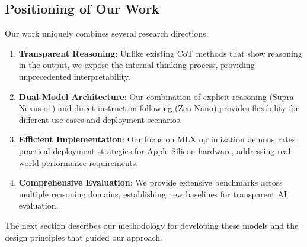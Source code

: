 \subsection{Positioning of Our Work}

Our work uniquely combines several research directions:

\begin{enumerate}
    \item \textbf{Transparent Reasoning}: Unlike existing CoT methods that show reasoning in the output, we expose the internal thinking process, providing unprecedented interpretability.
    
    \item \textbf{Dual-Model Architecture}: Our combination of explicit reasoning (Supra Nexus o1) and direct instruction-following (Zen Nano) provides flexibility for different use cases and deployment scenarios.
    
    \item \textbf{Efficient Implementation}: Our focus on MLX optimization demonstrates practical deployment strategies for Apple Silicon hardware, addressing real-world performance requirements.
    
    \item \textbf{Comprehensive Evaluation}: We provide extensive benchmarks across multiple reasoning domains, establishing new baselines for transparent AI evaluation.
\end{enumerate}

The next section describes our methodology for developing these models and the design principles that guided our approach.
